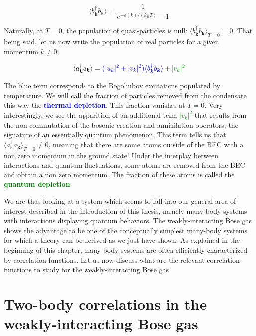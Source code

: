 \begin{equation}
    \langle b^{\dagger}_{\bm{k}}  b_{\bm{k}} \rangle=\frac{1}{e^{-\varepsilon(k)/(k_B T)}-1} 
    \label{eq:bose_qp}
\end{equation}

Naturally, at $T=0$, the population of quasi-particles is null: $\langle b^{\dagger}_{\bm{k}}  b_{\bm{k}} \rangle_{T=0}=0$. That being said, let us now write the population of real particles for a given momentum $k \neq 0$:

\begin{equation}
    \langle a^{\dagger}_{\bm{k}}  a_{\bm{k}} \rangle=\textcolor{blue}{(|u_k|^2+|v_k|^2)\langle b^{\dagger}_{\bm{k}}  b_{\bm{k}} \rangle} + \textcolor{green}{|v_k|^2}
\end{equation}

The blue term corresponds to the Bogoliubov excitations populated by temperature. We will call the fraction of particles removed from the condensate this way the \textcolor{blue}{\textbf{thermal depletion}}. This fraction vanishes at $T=0$. Very interestingly, we see the apparition of an additional term \textcolor{green}{$|v_k|^2$} that results from the non commutation of the bosonic creation and annihilation operators, the signature of an essentially quantum phenomenon. This term tells us that $\langle a^{\dagger}_{\bm{k}}  a_{\bm{k}} \rangle_{T=0} \neq 0$, meaning that there are some atoms outside of the BEC with a non zero momentum in the ground state! Under the interplay between interactions and quantum fluctuations, some atoms are removed from the BEC and obtain a non zero momentum. The fraction of these atoms is called the \textcolor{green}{\textbf{quantum depletion}}. 

We are thus looking at a system which seems to fall into our general area of interest described in the introduction of this thesis, namely many-body systems with interactions displaying quantum behaviors. The weakly-interacting Bose gas shows the advantage to be one of the conceptually simplest many-body systems for which a theory can be derived as we just have shown. As explained in the beginning of this chapter, many-body systems are often efficiently characterized by correlation functions. Let us now discuss what are the relevant correlation functions to study for the weakly-interacting Bose gas.


\section{Two-body correlations in the weakly-interacting Bose gas}

